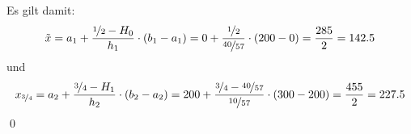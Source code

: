 \documentclass{abgabe}
\begin{document}
\begin{questions}
\begin{parts}
\begin{solution}
            Es gilt damit:
            \[
                \tilde{x} = a_1 + \frac{\nicefrac{1}{2} - H_0}{h_1} \cdot (b_1 - a_1) = 0 + \frac{\nicefrac{1}{2}}{\nicefrac{40}{57}} \cdot (200 - 0) = \frac{285}{2} = 142.5
            \]
            und
            \[
                x_{\nicefrac{3}{4}} = a_2 + \frac{\nicefrac{3}{4} - H_1}{h_2} \cdot (b_2 - a_2) = 200 + \frac{\nicefrac{3}{4} - \nicefrac{40}{57}}{\nicefrac{10}{57}} \cdot (300 - 200) = \frac{455}{2} = 227.5
            \]
            \qed
        \end{solution}
    \end{parts}
\end{questions}
\end{document}
